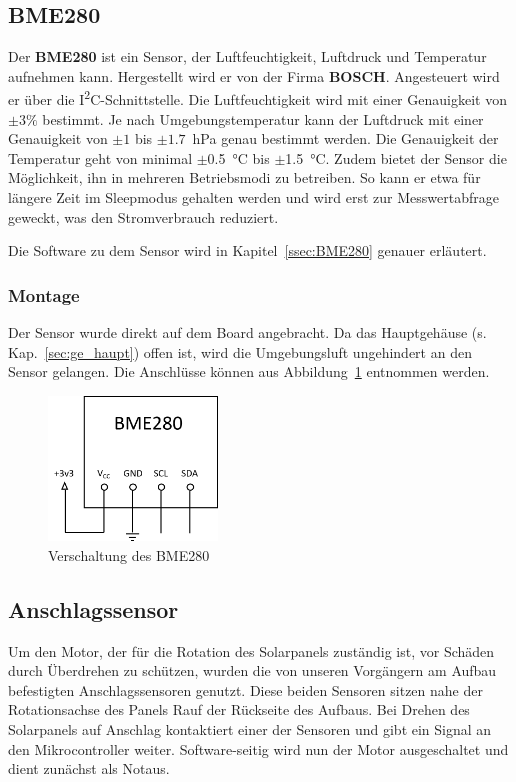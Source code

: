 \subsection{BME280}
Der \textbf{BME280} ist ein Sensor, der Luftfeuchtigkeit, Luftdruck und Temperatur aufnehmen kann. Hergestellt wird er von der Firma \textbf{BOSCH}. Angesteuert wird er über die I\textsuperscript{2}C-Schnittstelle. Die Luftfeuchtigkeit wird mit einer Genauigkeit von $\pm3\%$ bestimmt. Je nach Umgebungstemperatur kann der Luftdruck mit einer Genauigkeit von $\pm1$ bis $\pm1.7$~hPa genau bestimmt werden. Die Genauigkeit der Temperatur geht von minimal $\pm$\SI{0.5}{\celsius} bis $\pm$\SI{1.5}{\celsius}. Zudem bietet der Sensor die Möglichkeit, ihn in mehreren Betriebsmodi zu betreiben. So kann er etwa für längere Zeit im Sleepmodus gehalten werden und wird erst zur Messwertabfrage geweckt, was den Stromverbrauch reduziert.\cite{ds_bme280}

Die Software zu dem Sensor wird in Kapitel~\ref{ssec:BME280} genauer erläutert.

\subsubsection{Montage}
Der Sensor wurde direkt auf dem Board angebracht. Da das Hauptgehäuse (s. Kap.~\ref{sec:ge_haupt}) offen ist, wird die Umgebungsluft ungehindert an den Sensor gelangen. Die Anschlüsse können aus Abbildung~\ref{fig:BME280_Plan} entnommen werden.

\begin{figure}[H]
  \centering
  \includegraphics[width=0.4\textwidth]{./img/BME280_Plan.png}
  \caption{Verschaltung des BME280}\label{fig:BME280_Plan}
\end{figure}

\subsection{Anschlagssensor}
Um den Motor, der für die Rotation des Solarpanels zuständig ist, vor Schäden durch Überdrehen zu schützen, wurden die von unseren Vorgängern am Aufbau befestigten Anschlagssensoren genutzt. Diese beiden Sensoren sitzen nahe der Rotationsachse des Panels Rauf der Rückseite des Aufbaus. Bei Drehen des Solarpanels auf Anschlag kontaktiert einer der Sensoren und gibt ein Signal an den Mikrocontroller weiter. Software-seitig wird nun der Motor ausgeschaltet und dient zunächst als Notaus.

